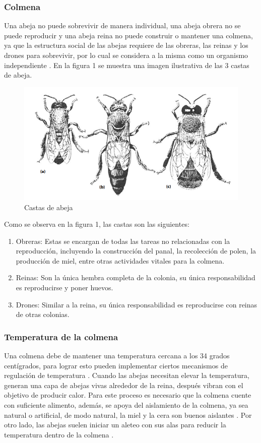 \documentclass[journal]{IEEEtran} %
\begin{document}
\subsubsection{Colmena}
Una abeja no puede sobrevivir de manera individual, una abeja obrera no se puede reproducir y una abeja reina no puede construir o mantener una colmena, ya que la estructura social de las abejas requiere de las obreras, las reinas y los drones para sobrevivir, por lo cual se considera a la misma como un organismo independiente \cite{DavidCrampABEEKEEPING}. En la figura 1 se muestra una imagen ilustrativa de las 3 castas de abeja.
\begin{figure}[h]
    \centering
    \includegraphics[width=\linewidth]{castas_de_abejas}
    \caption{Castas de abeja}
\end{figure}
\newpage
Como se observa en la figura 1, las castas son las siguientes:
\begin{enumerate}[label=\alph*)]
   \item Obreras: Estas se encargan de todas las tareas no relacionadas con la reproducción, incluyendo la construcción del panal, la recolección de polen, la producción de miel, entre otras actividades vitales para la colmena.
   \item Reinas: Son la única hembra completa de la colonia, su única responsabilidad es reproducirse y poner huevos.
    \item Drones: Similar a la reina, su única responsabilidad es reproducirse con reinas de otras colonias.
\end{enumerate}

\subsubsection{Temperatura de la colmena}
Una colmena debe de mantener una temperatura cercana a los 34 grados centígrados, para lograr esto pueden implementar ciertos mecanismos de regulación de temperatura \cite{DavidCrampABEEKEEPING}.
Cuando las abejas necesitan elevar la temperatura, generan una capa de abejas vivas alrededor de la reina, después vibran con el objetivo de producir calor. Para este proceso es necesario que la colmena cuente con suficiente alimento, además, se apoya del aislamiento de la colmena, ya sea natural o artificial, de modo natural, la miel y la cera son buenos aislantes \cite{Chadwick2016TheBook}.
Por otro lado, las abejas suelen iniciar un aleteo con sus alas para reducir la temperatura dentro de la colmena \cite{Chadwick2016TheBook}.
\end{document}
